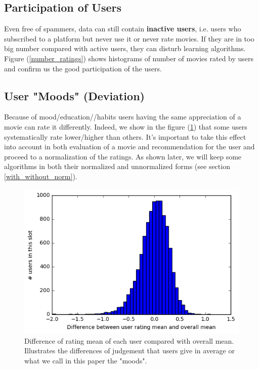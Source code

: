 \documentclass[10pt,conference,compsocconf]{IEEEtran}
\begin{document}
\subsection{Participation of Users}

Even free of spammers, data can still contain \textbf{inactive users}, i.e. users who subscribed to a platform but never use it or never rate movies. If they are in too big number compared with active users, they can disturb learning algorithms. Figure (\ref{number_ratings}) shows histograms of number of movies rated by users and confirm us the good participation of the users.

\subsection{User "Moods" (Deviation)}

Because of mood/education//habits users having the same appreciation of a movie can rate it differently. Indeed, we show in the figure (\ref{mood}) that some users systematically rate lower/higher than others. It's important to take this effect into account in both evaluation of a movie and recommendation for the user and proceed to a normalization of the ratings. As shown later, we will keep some algorithms in both their normalized and unnormalized forms (see section \ref{with_without_norm}).

\begin{figure}[htbp] %
  \centering
  \includegraphics[width=\columnwidth]{img/Deviation_mean}
  \caption{Difference of rating mean of each user compared with overall mean. Illustrates the differences of judgement that users give in average or what we call in this paper the "moods".}
  \vspace{-3mm}
  \label{mood}
\end{figure}
\end{document}
